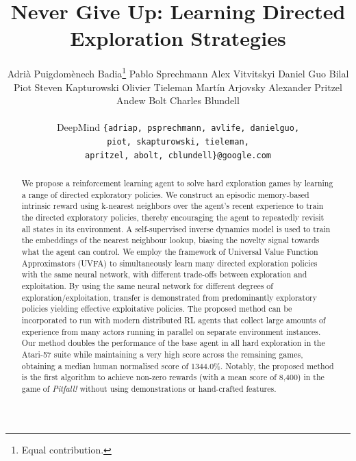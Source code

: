 \documentclass{article} %
\title{Never Give Up: Learning Directed \\Exploration Strategies}
\author{%
  Adri\`a Puigdom\`enech Badia\thanks{Equal contribution.} %
  \quad
  Pablo Sprechmann\footnotemark[1] %
  \quad
  Alex Vitvitskyi%
  \quad
  Daniel Guo%
  \And
  Bilal Piot%
  \quad
  Steven Kapturowski%
  \quad
  Olivier Tieleman%
  \quad
  Mart\'in Arjovsky %
  \And
  Alexander Pritzel %
  \quad
  Andew Bolt%
  \quad
  Charles Blundell %
  \\ \\
  DeepMind
  \texttt{\{adriap, psprechmann, avlife, danielguo,} \\
  \quad \quad \quad \quad \quad \texttt{piot, skapturowski, tieleman,} \\
  \quad \quad \quad \quad \quad \texttt{apritzel, abolt, cblundell\}@google.com} \\
}
\begin{document}
\maketitle

\begin{abstract}
We propose a reinforcement learning agent to solve hard exploration games by learning a range of directed exploratory policies. We construct an episodic memory-based intrinsic reward using k-nearest neighbors over the agent's recent experience to train the directed exploratory policies, thereby encouraging the agent to repeatedly revisit all states in its environment.
A self-supervised inverse dynamics model is used to train the embeddings of the nearest neighbour lookup, biasing the novelty signal towards what the agent can control. We employ the framework of Universal Value Function Approximators (UVFA) to simultaneously learn many directed exploration policies with the same neural network, with different trade-offs between exploration and exploitation.
By using the same neural network for different degrees of exploration/exploitation, transfer is demonstrated from predominantly exploratory policies yielding effective exploitative policies.
The proposed method can be incorporated to run with modern distributed RL agents that collect large amounts of experience from many actors running in parallel on separate environment instances.
Our method doubles the performance of the base agent in all hard exploration in the Atari-57 suite while maintaining a very high score across the remaining games, obtaining a median human normalised score of 1344.0\%. Notably, the proposed method is the first algorithm to achieve non-zero rewards (with a mean score of 8,400) in the game of \textit{Pitfall!} without using demonstrations or hand-crafted features.
\end{abstract}
\end{document}
